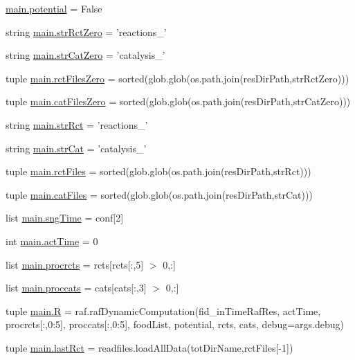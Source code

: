 \begin{DoxyCompactItemize}
\item 
\hyperlink{a00117_abe4c267a63409b1b7cd9c6aaf0779b4a}{main.\-potential} = False
\item 
string \hyperlink{a00117_adbfa32333003aa707723362b43bc11ff}{main.\-str\-Rct\-Zero} = 'reactions\-\_\-'
\item 
string \hyperlink{a00117_a6bb1e2c0e0d0a9e63313c082ee4eec76}{main.\-str\-Cat\-Zero} = 'catalysis\-\_\-'
\item 
tuple \hyperlink{a00117_aa37eddd86a00bf98dff8cc9260d6d13b}{main.\-rct\-Files\-Zero} = sorted(glob.\-glob(os.\-path.\-join(res\-Dir\-Path,str\-Rct\-Zero)))
\item 
tuple \hyperlink{a00117_a7ab6089d577bd60acf22b92e84930523}{main.\-cat\-Files\-Zero} = sorted(glob.\-glob(os.\-path.\-join(res\-Dir\-Path,str\-Cat\-Zero)))
\item 
string \hyperlink{a00117_a28a37e653a4c0984df32f8d83c3596ff}{main.\-str\-Rct} = 'reactions\-\_\-'
\item 
string \hyperlink{a00117_ab12df661b7defb4d7077777ad7d6352d}{main.\-str\-Cat} = 'catalysis\-\_\-'
\item 
tuple \hyperlink{a00117_a9016a8f5eafe76e4e8dbb1bc3ce94af5}{main.\-rct\-Files} = sorted(glob.\-glob(os.\-path.\-join(res\-Dir\-Path,str\-Rct)))
\item 
tuple \hyperlink{a00117_a189dc9cf606d870dacab059d5e7dca24}{main.\-cat\-Files} = sorted(glob.\-glob(os.\-path.\-join(res\-Dir\-Path,str\-Cat)))
\item 
list \hyperlink{a00117_ab4296f1ae2e4c4bb597ca27e84849510}{main.\-sng\-Time} = conf\mbox{[}2\mbox{]}
\item 
int \hyperlink{a00117_a9c2013c88f8354ccf6504c51843f1d5e}{main.\-act\-Time} = 0
\item 
list \hyperlink{a00117_a2120e8355b3501aed0114a74091d56c1}{main.\-procrcts} = rcts\mbox{[}rcts\mbox{[}\-:,5\mbox{]} $>$ 0,\-:\mbox{]}
\item 
list \hyperlink{a00117_a4e3c4b627d098aef6c7905cb20683e07}{main.\-proccats} = cats\mbox{[}cats\mbox{[}\-:,3\mbox{]} $>$ 0,\-:\mbox{]}
\item 
tuple \hyperlink{a00117_aa51f04a64cdea4fbde3c2d484d06d443}{main.\-R} = raf.\-raf\-Dynamic\-Computation(fid\-\_\-in\-Time\-Raf\-Res, act\-Time, procrcts\mbox{[}\-:,0\-:5\mbox{]}, proccats\mbox{[}\-:,0\-:5\mbox{]}, food\-List, potential, rcts, cats, debug=args.\-debug)
\item 
tuple \hyperlink{a00117_a519d451fb14acb6fb50a108ac2b8b261}{main.\-last\-Rct} = readfiles.\-load\-All\-Data(tot\-Dir\-Name,rct\-Files\mbox{[}-\/1\mbox{]})

\end{DoxyCompactItemize}
